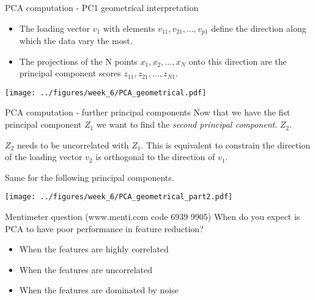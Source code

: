 \documentclass[notes]{beamer}          %
\begin{document}
\begin{frame}{PCA computation - PC1 geometrical interpretation}
\begin{itemize}
\item The loading vector $v_1$ with elements $v_{11}, v_{21}, \dots, v_{p1}$ define the direction along which the data vary the most.
\item The projections of the N points $x_1, x_2, \dots, x_N$ onto this direction are the principal component scores $z_{11}, z_{21}, \dots, z_{N1}$.
\end{itemize}

\begin{center}
\texttt{[image: ../figures/week\_6/PCA\_geometrical.pdf]}  
\end{center}
\end{frame}

\begin{frame}{PCA computation - further principal components}
Now that we have the fist principal component $Z_1$ we want to find the \textit{second principal component}. $Z_2$. 

\vspace{2mm} 

$Z_2$ needs to be uncorrelated with $Z_1$. This is equivalent to constrain the direction of the loading vector $v_2$  is orthogonal to the direction of $v_1$.

\vspace{2mm} 
 
 Same for the following principal components.
 
 \begin{center}
\texttt{[image: ../figures/week\_6/PCA\_geometrical\_part2.pdf]}  
\end{center}
 

\end{frame}

\begin{frame}{Mentimeter question (www.menti.com code 6939 9905)}
When do you expect is PCA to have poor performance in feature reduction?
\begin{itemize}
\item When the features are highly correlated
\item When the features are uncorrelated
\item When the features are dominated by noise
\end{itemize}
\end{frame}
\end{document}
